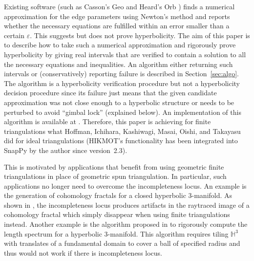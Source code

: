 \documentclass[utopia,fullpage]{nmd/article}
\renewcommand\H{\mathbb H}
\begin{document}
Existing software (such as Casson's Geo \cite{casson:geo} and Heard's Orb \cite{orb}) finds a numerical approximation for the edge parameters using Newton's method and reports whether the necessary equations are fulfilled within an error smaller than a certain $\varepsilon$. This suggests but does not prove hyperbolicity. The aim of this paper is to describe how to take such a numerical approximation and rigorously prove hyperbolicity by giving real intervals that are verified to contain a solution to all the necessary equations and inequalities. An algorithm either returning such intervals or (conservatively) reporting failure is described in Section~\ref{sec:algo}.
The algorithm is a hyperbolicity verification procedure but not a hyperbolicity decision procedure since its failure just means that the given candidate approximation was not close enough to a hyperbolic structure or needs to be perturbed to avoid ``gimbal lock'' (explained below). An implementation of this algorithm is available at \cite{veriClosedRepo}. Therefore, this paper is achieving for finite triangulations what Hoffman, Ichihara, Kashiwagi, Masai, Oishi, and Takayasu \cite{hikmot} did for ideal triangulations (HIKMOT's functionality has been integrated into SnapPy \cite{SnapPy} by the author since version~2.3). 

This is motivated by applications that benefit from using geometric finite triangulations in place of geometric spun triangulation. In particular, such applications no longer need to overcome the incompleteness locus. An example is the generation of cohomology fractals for a closed hyperbolic 3-manifold. As shown in  \cite[Figure~8.7]{cohomologyFractals}, the incompleteness locus produces artifacts in the raytraced image of a cohomology fractal which simply disappear when using finite triangulations instead. Another example is the algorithm proposed in \cite{HHGT} to rigorously compute the length spectrum for a hyperbolic 3-manifold. This algorithm requires tiling $\H^3$ with translates of a fundamental domain to cover a ball of specified radius and thus would not work if there is incompleteness locus.
\end{document}
